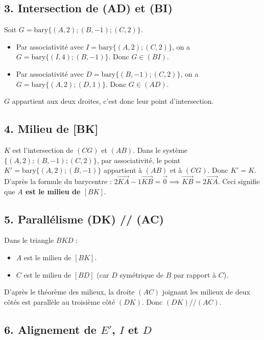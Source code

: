 \documentclass[12pt,a4paper]{article}
\begin{document}
\subsection*{3. Intersection de (AD) et (BI)}

Soit $G = \text{bary}\{(A, 2); (B, -1); (C, 2)\}$. 
\begin{itemize}
    \item Par associativité avec $I = \text{bary}\{(A, 2); (C, 2)\}$, on a $G = \text{bary}\{(I, 4); (B, -1)\}$. Donc \textbf{$G \in (BI)$}.
    \item Par associativité avec $D = \text{bary}\{(B, -1); (C, 2)\}$, on a $G = \text{bary}\{(A, 2); (D, 1)\}$. Donc \textbf{$G \in (AD)$}.
\end{itemize}
$G$ appartient aux deux droites, c'est donc leur point d'intersection.

\subsection*{4. Milieu de [BK]}

$K$ est l'intersection de $(CG)$ et $(AB)$. Dans le système $\{(A, 2); (B, -1); (C, 2)\}$, par associativité, le point $K' = \text{bary}\{(A, 2); (B, -1)\}$ appartient à $(AB)$ et à $(CG)$. Donc $K' = K$.
D'après la formule du barycentre : $2\overrightarrow{KA} - 1\overrightarrow{KB} = \vec{0} \implies \overrightarrow{KB} = 2\overrightarrow{KA}$. 
Ceci signifie que \textbf{$A$ est le milieu de $[BK]$}.

\subsection*{5. Parallélisme (DK) // (AC)}

Dans le triangle $BKD$ :
\begin{itemize}
    \item $A$ est le milieu de $[BK]$.
    \item $C$ est le milieu de $[BD]$ (car $D$ symétrique de $B$ par rapport à $C$).
\end{itemize}
D'après le théorème des milieux, la droite $(AC)$ joignant les milieux de deux côtés est parallèle au troisième côté $(DK)$. Donc \textbf{$(DK) // (AC)$}.

\subsection*{6. Alignement de $E'$, $I$ et $D$}
\end{document}

